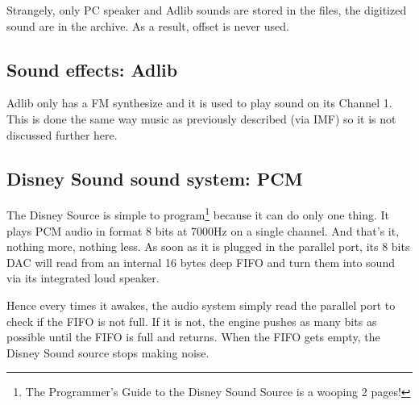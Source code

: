\par
\begin{minipage}{\textwidth}

\end{minipage}
\par
Strangely, only PC speaker and Adlib sounds are stored in the  files, the digitized sound are in the  archive. As a result, offset  is never used.\\
\par



\subsection{Sound effects: Adlib}
Adlib only has a FM synthesize and it is used to play sound on its Channel 1. This is done the same way music as previously described (via IMF) so it is not discussed further here.












\subsection{Disney Sound sound system: PCM}
The Disney Source is simple to program\footnote{The Programmer's Guide to the Disney Sound Source is a wooping 2 pages!} because it can do only one thing. It plays PCM audio in format 8 bits at 7000Hz on a single channel. And that's it, nothing more, nothing less. As soon as it is plugged in the parallel port, its 8 bits DAC will read from an internal 16 bytes deep FIFO and turn them into sound via its integrated loud speaker.\\ 
\par
Hence every times it awakes, the audio system simply read the parallel port to check if the FIFO is not full. If it is not, the engine pushes as many bits as possible until the FIFO is full and returns. When the FIFO gets empty, the Disney Sound source stops making noise.\\
\par










